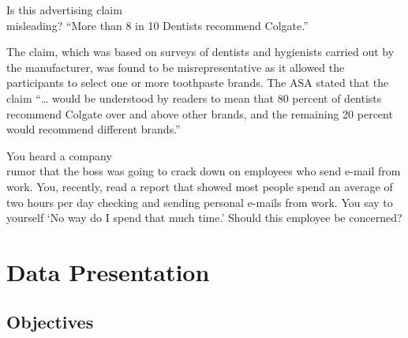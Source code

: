\documentclass[11pt]{book}\usepackage[]{graphicx}\usepackage[]{color}
\begin{document}
\begin{exercises}
\begin{exercise}   %

Is this advertising claim \\ misleading? 
``More than 8 in 10 Dentists recommend Colgate.''

\end{exercise}
\begin{solution}    %

The claim, which was based on surveys of dentists and hygienists carried out by the manufacturer, was found to be misrepresentative as it allowed the participants to select one or more toothpaste brands. The ASA stated that the claim ``… would be understood by readers to mean that 80 percent of dentists recommend Colgate over and above other brands, and the remaining 20 percent would recommend different brands.''

\end{solution}

\begin{exercise}   %

You heard a company \\ rumor that the boss was going to crack down on employees who send e-mail from work.  You, recently, read a report that showed most people spend an average of two hours per day checking and sending personal e-mails from work.  You say to yourself `No way do I spend that much time.'  Should this employee be concerned?    

\end{exercise}
\begin{solution}    %

\end{solution}






\end{exercises}

\onecolumn




\chapter{Data Presentation}
\label{chap:ch2}

\section{Objectives}
\end{document}
